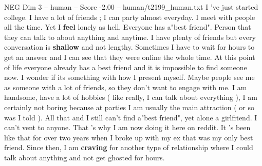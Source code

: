 \begin{textsample}{NEG Dim 3 – human – Score -2.00 – human/t2199\_human.txt}  \label{ex:f3_neg_040}
I 've just started college.
I have a lot of friends ; I can party almost everyday.
I meet with people all the time.
Yet I \textbf{feel} lonely as hell.
Everyone has a"best friend".
Person that they can talk to about anything and anytime.
I have plenty of friends but every conversation is \textbf{shallow} and not lengthy.
Sometimes I have to wait for hours to get an answer and I can see that they were online the whole time.
At this point of life everyone already has a best friend and it is impossible to find someone now.
I wonder if its something with how I present myself.
Maybe people see me as someone with a lot of friends, so they don't want to engage with me.
I am handsome, have a lot of hobbies ( like really, I can talk about everything ), I am certainly not boring because at parties I am usually the main attraction ( or so was I told ).
All that and I still can't find a"best friend", yet alone a girlfriend.
I can't vent to anyone.
That 's why I am now doing it here on reddit.
It 's been like that for over two years when I broke up with my ex that was my only best friend.
Since then, I am \textbf{craving} for another type of relationship where I could talk about anything and not get ghosted for hours.

\end{textsample}

